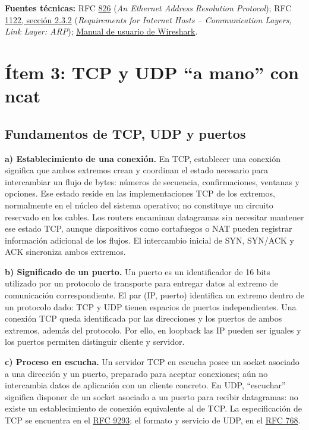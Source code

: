 \documentclass[12pt,a4paper]{article}
\let\oldsection\section
\renewcommand{\section}{\clearpage\oldsection}
\begin{document}
{\small\textbf{Fuentes técnicas:}
RFC \href{https://www.rfc-editor.org/rfc/rfc826}{826} (\emph{An Ethernet Address Resolution Protocol});
RFC \href{https://www.rfc-editor.org/rfc/rfc1122#section-2.3.2}{1122, sección 2.3.2} (\emph{Requirements for Internet Hosts -- Communication Layers, Link Layer: ARP});
\href{https://www.wireshark.org/docs/wsug_html_chunked/}{Manual de usuario de Wireshark}.\par}

\section{Ítem 3: TCP y UDP ``a mano'' con ncat}

\subsection{Fundamentos de TCP, UDP y puertos}

\textbf{a) Establecimiento de una conexión.} En TCP, establecer una conexión
significa que ambos extremos crean y coordinan el estado necesario para
intercambiar un flujo de bytes: números de secuencia, confirmaciones,
ventanas y opciones. Ese estado reside en las implementaciones TCP de los
extremos, normalmente en el núcleo del sistema operativo; no constituye un
circuito reservado en los cables. Los routers encaminan datagramas sin
necesitar mantener ese estado TCP, aunque dispositivos como cortafuegos o
NAT pueden registrar información adicional de los flujos. El intercambio
inicial de SYN, SYN/ACK y ACK sincroniza ambos extremos.

\textbf{b) Significado de un puerto.} Un puerto es un identificador de
16 bits utilizado por un protocolo de transporte para entregar datos al
extremo de comunicación correspondiente. El par (IP, puerto) identifica un
extremo dentro de un protocolo dado: TCP y UDP tienen espacios de puertos
independientes. Una conexión TCP queda identificada por las direcciones y
los puertos de ambos extremos, además del protocolo. Por ello, en loopback
las IP pueden ser iguales y los puertos permiten distinguir cliente y servidor.

\textbf{c) Proceso en escucha.} Un servidor TCP en escucha posee un socket
asociado a una dirección y un puerto, preparado para aceptar conexiones;
aún no intercambia datos de aplicación con un cliente concreto. En UDP,
``escuchar'' significa disponer de un socket asociado a un puerto para
recibir datagramas: no existe un establecimiento de conexión equivalente
al de TCP. La especificación de TCP se encuentra en el
\href{https://www.rfc-editor.org/rfc/rfc9293.html}{RFC 9293}; el formato y
servicio de UDP, en el
\href{https://www.rfc-editor.org/rfc/rfc768.html}{RFC 768}.
\end{document}
